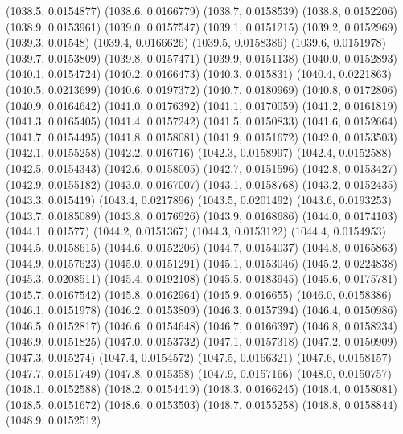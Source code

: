 {					(1038.5, 0.0154877)
					(1038.6, 0.0166779)
					(1038.7, 0.0158539)
					(1038.8, 0.0152206)
					(1038.9, 0.0153961)
					(1039.0, 0.0157547)
					(1039.1, 0.0151215)
					(1039.2, 0.0152969)
					(1039.3, 0.01548)
					(1039.4, 0.0166626)
					(1039.5, 0.0158386)
					(1039.6, 0.0151978)
					(1039.7, 0.0153809)
					(1039.8, 0.0157471)
					(1039.9, 0.0151138)
					(1040.0, 0.0152893)
					(1040.1, 0.0154724)
					(1040.2, 0.0166473)
					(1040.3, 0.015831)
					(1040.4, 0.0221863)
					(1040.5, 0.0213699)
					(1040.6, 0.0197372)
					(1040.7, 0.0180969)
					(1040.8, 0.0172806)
					(1040.9, 0.0164642)
					(1041.0, 0.0176392)
					(1041.1, 0.0170059)
					(1041.2, 0.0161819)
					(1041.3, 0.0165405)
					(1041.4, 0.0157242)
					(1041.5, 0.0150833)
					(1041.6, 0.0152664)
					(1041.7, 0.0154495)
					(1041.8, 0.0158081)
					(1041.9, 0.0151672)
					(1042.0, 0.0153503)
					(1042.1, 0.0155258)
					(1042.2, 0.016716)
					(1042.3, 0.0158997)
					(1042.4, 0.0152588)
					(1042.5, 0.0154343)
					(1042.6, 0.0158005)
					(1042.7, 0.0151596)
					(1042.8, 0.0153427)
					(1042.9, 0.0155182)
					(1043.0, 0.0167007)
					(1043.1, 0.0158768)
					(1043.2, 0.0152435)
					(1043.3, 0.015419)
					(1043.4, 0.0217896)
					(1043.5, 0.0201492)
					(1043.6, 0.0193253)
					(1043.7, 0.0185089)
					(1043.8, 0.0176926)
					(1043.9, 0.0168686)
					(1044.0, 0.0174103)
					(1044.1, 0.01577)
					(1044.2, 0.0151367)
					(1044.3, 0.0153122)
					(1044.4, 0.0154953)
					(1044.5, 0.0158615)
					(1044.6, 0.0152206)
					(1044.7, 0.0154037)
					(1044.8, 0.0165863)
					(1044.9, 0.0157623)
					(1045.0, 0.0151291)
					(1045.1, 0.0153046)
					(1045.2, 0.0224838)
					(1045.3, 0.0208511)
					(1045.4, 0.0192108)
					(1045.5, 0.0183945)
					(1045.6, 0.0175781)
					(1045.7, 0.0167542)
					(1045.8, 0.0162964)
					(1045.9, 0.016655)
					(1046.0, 0.0158386)
					(1046.1, 0.0151978)
					(1046.2, 0.0153809)
					(1046.3, 0.0157394)
					(1046.4, 0.0150986)
					(1046.5, 0.0152817)
					(1046.6, 0.0154648)
					(1046.7, 0.0166397)
					(1046.8, 0.0158234)
					(1046.9, 0.0151825)
					(1047.0, 0.0153732)
					(1047.1, 0.0157318)
					(1047.2, 0.0150909)
					(1047.3, 0.015274)
					(1047.4, 0.0154572)
					(1047.5, 0.0166321)
					(1047.6, 0.0158157)
					(1047.7, 0.0151749)
					(1047.8, 0.015358)
					(1047.9, 0.0157166)
					(1048.0, 0.0150757)
					(1048.1, 0.0152588)
					(1048.2, 0.0154419)
					(1048.3, 0.0166245)
					(1048.4, 0.0158081)
					(1048.5, 0.0151672)
					(1048.6, 0.0153503)
					(1048.7, 0.0155258)
					(1048.8, 0.0158844)
					(1048.9, 0.0152512)
}
